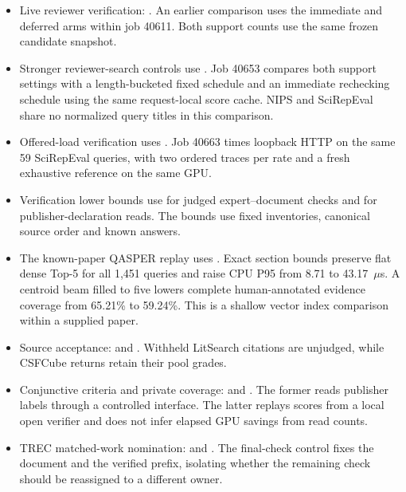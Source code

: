 \begin{itemize}
\item Live reviewer verification: . An earlier comparison uses the immediate and deferred arms within job 40611. Both support counts use the same frozen candidate snapshot.
\item Stronger reviewer-search controls use . Job 40653 compares both support settings with a length-bucketed fixed schedule and an immediate rechecking schedule using the same request-local score cache. NIPS and SciRepEval share no normalized query titles in this comparison.
\item Offered-load verification uses . Job 40663 times loopback HTTP on the same 59 SciRepEval queries, with two ordered traces per rate and a fresh exhaustive reference on the same GPU.
\item Verification lower bounds use  for judged expert--document checks and  for publisher-declaration reads. The bounds use fixed inventories, canonical source order and known answers.
\item The known-paper QASPER replay uses . Exact section bounds preserve flat dense Top-5 for all 1,451 queries and raise CPU P95 from 8.71 to 43.17~$\mu$s. A centroid beam filled to five lowers complete human-annotated evidence coverage from 65.21\% to 59.24\%. This is a shallow vector index comparison within a supplied paper.
\item Source acceptance:  and . Withheld LitSearch citations are unjudged, while CSFCube returns retain their pool grades.
\item Conjunctive criteria and private coverage:  and . The former reads publisher labels through a controlled interface. The latter replays scores from a local open verifier and does not infer elapsed GPU savings from read counts.
\item TREC matched-work nomination:  and . The final-check control fixes the document and the verified prefix, isolating whether the remaining check should be reassigned to a different owner.

\end{itemize}
